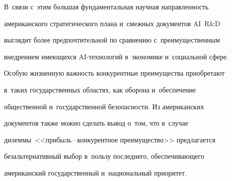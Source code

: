 В~связи с~этим большая фундаментальная научная направленность


американского стратегического плана и~смеж\-ных документов AI~R\&D


выглядит более предпочтительной по сравнению с~преимущественным


внедрением имеющихся AI-технологий в~экономике и~социальной сфере.


Особую жизненную важность конкурентные преимущества приобретают


в~таких государственных областях, как оборона и~обеспечение


общественной и~государственной безопас\-ности. Из американских


документов также можно сделать вывод о~том, что в~случае


дилеммы~<<при\-быль\,--\,кон\-ку\-рент\-ное преимущество>> предлагается


безальтернативный выбор в~пользу последнего, обес\-пе\-чи\-ва\-юще\-го


американский государственный и~национальный приоритет.





